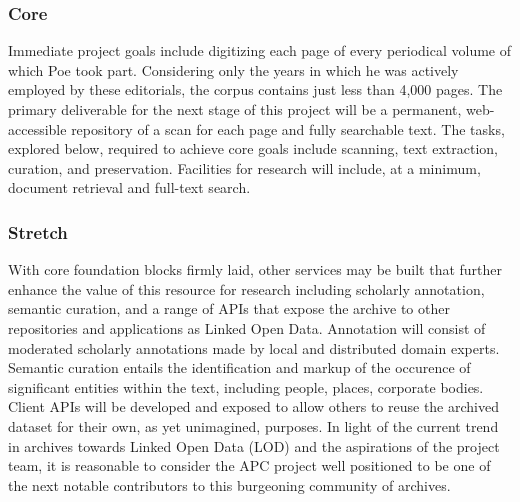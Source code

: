 \subsubsection{Core}
Immediate project goals include digitizing each page of every periodical volume of which Poe took part. Considering only the years in which he was actively employed by these editorials, the corpus contains just less than 4,000 pages. The primary deliverable for the next stage of this project will be a permanent, web-accessible repository of a scan for each page and fully searchable text. The tasks, explored below, required to achieve core goals include scanning, text extraction, curation, and preservation. Facilities for research will include, at a minimum, document retrieval and full-text search. 

\subsubsection{Stretch}
With core foundation blocks firmly laid, other services may be built that further enhance the value of this resource for research including scholarly annotation, semantic curation, and a range of APIs that expose the archive to other repositories and applications as Linked Open Data. Annotation will consist of moderated scholarly annotations made by local and distributed domain experts.  Semantic curation entails the identification and markup of the occurence of significant entities within the text, including people, places, corporate bodies. Client APIs will be developed and exposed to allow others to reuse the archived dataset for their own, as yet unimagined, purposes. In light of the current trend \needcite in archives towards Linked Open Data (LOD) and the aspirations of the project team, it is reasonable to consider the APC project well positioned to be one of the next notable contributors to this burgeoning community of archives.